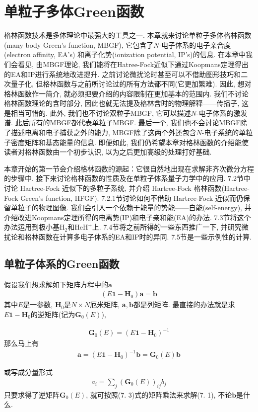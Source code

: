 \chapter{单粒子多体Green函数}
\label{ch:7}
格林函数技术是多体理论中最强大的工具之一. 
本章就来讨论单粒子多体格林函数(many body Green's function, MBGF), 
它包含了$N$-电子体系的电子亲合度(electron affinity, EA's)
和离子化势(ionization potential, IP's)的信息. 
在本章中我们会看见, 
由MBGF理论, 
我们能将在Hatree-Fock近似下通过Koopmans定理得出的EA和IP进行系统地改进提升. 
之前讨论微扰论时甚至可以不借助图形技巧和二次量子化, 
但格林函数与之前所讨论过的所有方法都不同(它更加繁难). 
因此, 
想对格林函数作一简介, 
就必须把要介绍的内容限制在更加基本的范围内. 
我们不讨论格林函数理论的含时部分, 
因此也就无法提及格林含时的物理解释——传播子, 
这是相当可惜的. 
此外, 
我们也不讨论双粒子MBGF, 
它可以描述$N$-电子体系的激发谱. 
此后所有的MBGF都代表单粒子MBGF. 
最后一个, 
我们也不会讨论MBGF除了描述电离和电子捕获之外的能力, 
MBGF除了这两个外还包含$N$-电子系统的单粒子密度矩阵和基态能量的信息. 
即便如此, 
我们仍希望本章对格林函数的介绍能使读者对格林函数由一个初步认识, 
以为之后更加高级的处理打好基础.


本章开始的第一节会介绍格林函数的源起：它很自然地出现在求解非齐次微分方程的步骤中. 
接下来讨论格林函数的性质及在单粒子体系量子力学中的应用. 
7.2节中讨论 Hartree-Fock 近似下的多粒子系统, 
并介绍 Hartree-Fock 格林函数(Hartree-Fock Green's function, HFGF). 
7.2.1节讨论如何不借助 Hartree-Fock 近似而仍保留单粒子的物理图像. 
我们会引入一个依赖于能量的势能——自能(self-energy), 
并介绍改进Koopmans定理所得的电离势(IP)和电子亲和能(EA)的办法. 
7.3节将这个办法运用到极小基$\mathrm{H}_2$和$\mathrm{HeH}^+$上. 
7.4节将之前所得的一些东西推广一下, 
并研究微扰论和格林函数在计算多电子体系的EA和IP时的异同. 
7.5节是一些示例性的计算.

\section{单粒子体系的Green函数}
假设我们想求解如下矩阵方程中的$\mathbf{a}$
\begin{align}
(E\mathbf{1} - \mathbf{H}_0)\mathbf{a} = \mathbf{b}
\end{align}
其中$E$是一参数, 
$\mathbf{H}_0$是$N\times N$厄米矩阵, 
$\mathbf{a,b}$都是列矩阵. 
最直接的办法就是求$E\mathbf{1} - \mathbf{H}_0$的逆矩阵(记为$\mathbf{G}_0(E)$),

\begin{align}
\mathbf{G}_0(E) = (E\mathbf{1} - \mathbf{H}_0)^{-1}
\end{align}
那么马上有
\begin{align}
\mathbf{a} = (E\mathbf{1} - \mathbf{H}_0)^{-1}\mathbf{b} = \mathbf{G}_0(E)\mathbf{b}\tag{7.3a}
\end{align}
\addtocounter{equation}{1}
或写成分量形式
\begin{align}
a_i = \sum_j (\mathbf{G}_0(E))_{ij}b_j\tag{7.3b}
\end{align}
只要求得了逆矩阵$\mathbf{G}_0(E)$, 
就可按照(7.
3)式的矩阵乘法来求解(7.
1), 
不论$\mathbf{b}$是什么.

